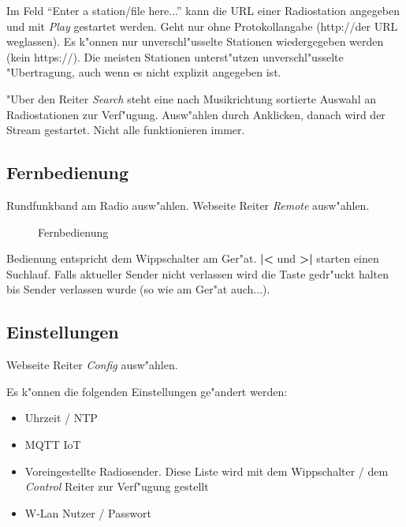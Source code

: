 \documentclass[ngerman,11pt,parskip=half] {scrartcl}
\begin{document}
Im Feld "`Enter a station/file here..."' kann die URL einer Radiostation angegeben und mit \emph{Play} gestartet werden. Geht nur ohne Protokollangabe (http://der URL weglassen). Es k"onnen nur unverschl"usselte Stationen wiedergegeben werden (kein https://). Die meisten Stationen unterst"utzen unverschl"usselte "Ubertragung, auch wenn es nicht explizit angegeben ist.

"Uber den Reiter \emph{Search} steht eine nach Musikrichtung sortierte Auswahl an Radiostationen zur Verf"ugung. Ausw"ahlen durch Anklicken, danach wird der Stream gestartet. Nicht alle funktionieren immer.

\subsection{Fernbedienung} \label{sec:bedienung:fernbedienung}

Rundfunkband am Radio ausw"ahlen. Webseite Reiter \emph{Remote} ausw"ahlen.

\begin{figure}[H]
\centering
{}
\caption{Fernbedienung} \label{fig:1}
\end{figure}

Bedienung entspricht dem Wippschalter am Ger"at. \textbf{|<} und \textbf{>|} starten einen Suchlauf. Falls aktueller Sender nicht verlassen wird die Taste gedr"uckt halten bis Sender verlassen wurde (so wie am Ger"at auch...).

\subsection{Einstellungen} \label{sec:bedienung:einstellungen}

Webseite Reiter \emph{Config} ausw"ahlen.

Es k"onnen die folgenden Einstellungen ge"andert werden:
\begin{itemize}
\item Uhrzeit / NTP
\item MQTT IoT 
\item Voreingestellte Radiosender. Diese Liste wird mit dem Wippschalter / dem \emph{Control} Reiter zur Verf"ugung gestellt
\item W-Lan Nutzer / Passwort
\end{itemize}
\end{document}
